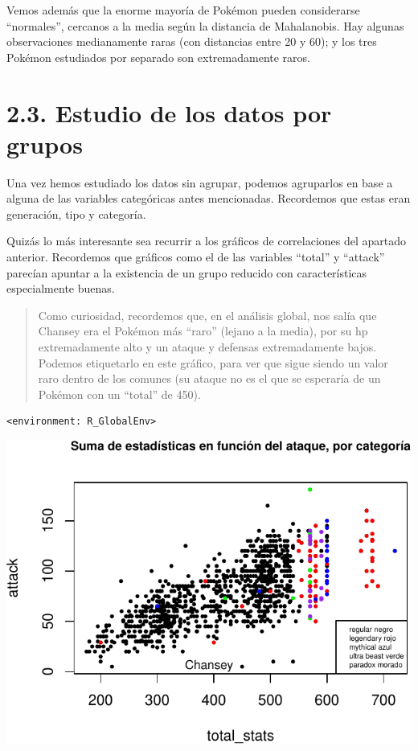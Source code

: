 \documentclass[
  12pt,
]{extreport}
\begin{document}
Vemos además que la enorme mayoría de Pokémon pueden considerarse
``normales'', cercanos a la media según la distancia de Mahalanobis. Hay
algunas observaciones medianamente raras (con distancias entre 20 y 60);
y los tres Pokémon estudiados por separado son extremadamente raros.

\section{2.3. Estudio de los datos por
grupos}\label{estudio-de-los-datos-por-grupos}

Una vez hemos estudiado los datos sin agrupar, podemos agruparlos en
base a alguna de las variables categóricas antes mencionadas. Recordemos
que estas eran generación, tipo y categoría.

Quizás lo más interesante sea recurrir a los gráficos de correlaciones
del apartado anterior. Recordemos que gráficos como el de las variables
``total'' y ``attack'' parecían apuntar a la existencia de un grupo
reducido con características especialmente buenas.

\begin{quote}
Como curiosidad, recordemos que, en el análisis global, nos salía que
Chansey era el Pokémon más ``raro'' (lejano a la media), por su hp
extremadamente alto y un ataque y defensas extremadamente bajos. Podemos
etiquetarlo en este gráfico, para ver que sigue siendo un valor raro
dentro de los comunes (su ataque no es el que se esperaría de un Pokémon
con un ``total'' de 450).
\end{quote}

\begin{verbatim}
<environment: R_GlobalEnv>
\end{verbatim}

\begin{center}
\includegraphics{trabajo_files/figure-pdf/unnamed-chunk-16-1.pdf}
\end{center}
\end{document}
